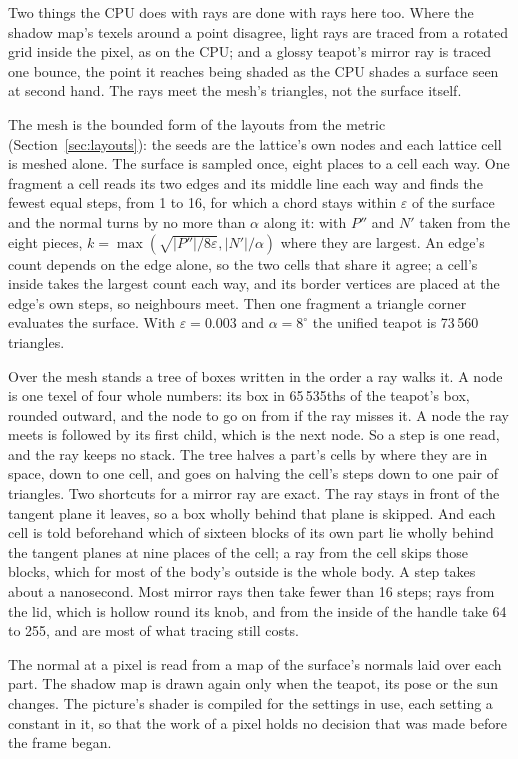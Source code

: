 \documentclass[journal]{IEEEtran}
\begin{document}
Two things the CPU does with rays are done with rays here too. Where
the shadow map's texels around a point disagree, light rays are traced
from a rotated grid inside the pixel, as on the CPU; and a glossy
teapot's mirror ray is traced one bounce, the point it reaches being
shaded as the CPU shades a surface seen at second hand. The rays meet
the mesh's triangles, not the surface itself.

The mesh is the bounded form of the layouts from the metric
(Section~\ref{sec:layouts}): the seeds are the lattice's own nodes and
each lattice cell is meshed alone. The surface is sampled once, eight
places to a cell each way. One fragment a cell reads its two edges and
its middle line each way and finds the fewest equal steps, from 1 to 16,
for which a chord stays within $\varepsilon$ of the surface and the
normal turns by no more than $\alpha$ along it: with $P''$ and $N'$
taken from the eight pieces, $k=\max(\sqrt{|P''|/8\varepsilon},
|N'|/\alpha)$ where they are largest. An edge's count depends on the
edge alone, so the two cells that share it agree; a cell's inside takes
the largest count each way, and its border vertices are placed at the
edge's own steps, so neighbours meet. Then one fragment a triangle
corner evaluates the surface. With $\varepsilon=0.003$ and
$\alpha=8^\circ$ the unified teapot is 73\,560 triangles.

Over the mesh stands a tree of boxes written in the order a ray walks
it. A node is one texel of four whole numbers: its box in 65\,535ths of
the teapot's box, rounded outward, and the node to go on from if the
ray misses it. A node the ray meets is followed by its first child,
which is the next node. So a step is one read, and the ray keeps no
stack. The tree halves a part's cells by where they are in space, down
to one cell, and goes on halving the cell's steps down to one pair of
triangles. Two shortcuts for a mirror ray are exact. The ray stays in
front of the tangent plane it leaves, so a box wholly behind that plane
is skipped. And each cell is told beforehand which of sixteen blocks of
its own part lie wholly behind the tangent planes at nine places of the
cell; a ray from the cell skips those blocks, which for most of the
body's outside is the whole body. A step takes about a nanosecond. Most
mirror rays then take fewer than 16 steps; rays from the lid, which is
hollow round its knob, and from the inside of the handle take 64 to
255, and are most of what tracing still costs.

The normal at a pixel is read from a map of the surface's normals laid
over each part. The shadow map is drawn again only when the teapot, its
pose or the sun changes. The picture's shader is compiled for the
settings in use, each setting a constant in it, so that the work of a
pixel holds no decision that was made before the frame began.
\end{document}
